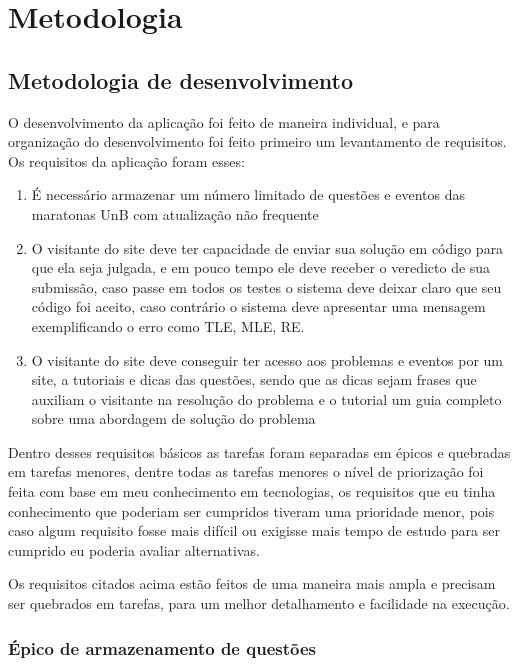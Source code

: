 \chapter[Metodologia]{Metodologia}

\section{Metodologia de desenvolvimento}

O desenvolvimento da aplicação foi feito de maneira individual, e para organização do desenvolvimento foi feito primeiro um levantamento de requisitos. Os requisitos da aplicação foram esses:
\begin{enumerate}

    \item É necessário armazenar um número limitado de questões e eventos das maratonas UnB com atualização não frequente
    \item O visitante do site deve ter capacidade de enviar sua solução em código para que ela seja julgada, e em pouco tempo ele deve receber o veredicto de sua submissão, caso passe em todos os testes o sistema deve deixar claro que seu código foi aceito, caso contrário o sistema deve apresentar uma mensagem exemplificando o erro como TLE, MLE, RE.
    \item O visitante do site deve conseguir ter acesso aos problemas e eventos por um site, a tutoriais e dicas das questões, sendo que as dicas sejam frases que auxiliam o visitante na resolução do problema e o tutorial um guia completo sobre uma abordagem de solução do problema
\end{enumerate}

Dentro desses requisitos básicos as tarefas foram separadas em épicos e quebradas em tarefas menores, dentre todas as tarefas menores o nível de priorização foi feita com base em meu conhecimento em tecnologias, os requisitos que eu tinha conhecimento que poderiam ser cumpridos tiveram uma prioridade menor, pois caso algum requisito fosse mais difícil ou exigisse mais tempo de estudo para ser cumprido eu poderia avaliar alternativas.

Os requisitos citados acima estão feitos de uma maneira mais ampla e precisam ser quebrados em tarefas, para um melhor detalhamento e facilidade na execução.

\subsection{Épico de armazenamento de questões}

